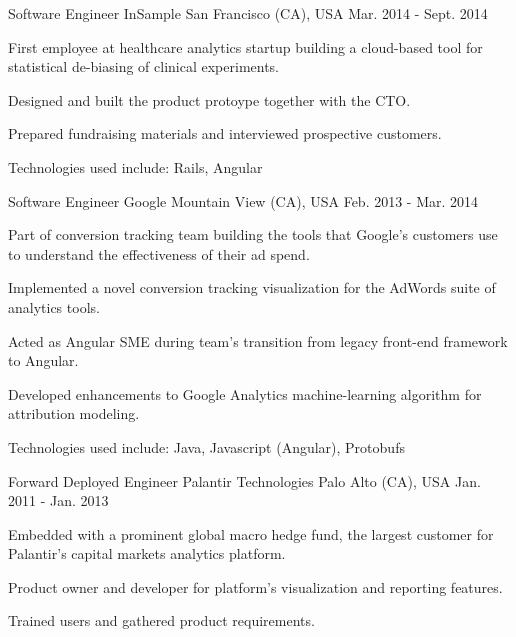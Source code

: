 \begin{cventries}
  \cventry
    {Software Engineer} %
    {InSample} %
    {San Francisco (CA), USA} %
    {Mar. 2014 - Sept. 2014} %
    {
      \begin{cvitems} %
        \item {First employee at healthcare analytics startup building a cloud-based tool for statistical de-biasing of clinical experiments.}
        \item {Designed and built the product protoype together with the CTO.}
        \item {Prepared fundraising materials and interviewed prospective customers.}
        \item {Technologies used include: Rails, Angular}
      \end{cvitems}
    }

  \cventry
    {Software Engineer} %
    {Google} %
    {Mountain View (CA), USA} %
    {Feb. 2013 - Mar. 2014} %
    {
      \begin{cvitems} %
        \item {Part of conversion tracking team building the tools that Google's customers use to understand the effectiveness of their ad spend.}
        \item {Implemented a novel conversion tracking visualization for the AdWords suite of analytics tools.}
        \item {Acted as Angular SME during team’s transition from legacy front-end framework to Angular.}
        \item {Developed enhancements to Google Analytics machine-learning algorithm for attribution modeling.}
        \item {Technologies used include: Java, Javascript (Angular), Protobufs}
      \end{cvitems}
    }

  \cventry
    {Forward Deployed Engineer} %
    {Palantir Technologies} %
    {Palo Alto (CA), USA} %
    {Jan. 2011 - Jan. 2013} %
    {
      \begin{cvitems} %
        \item {Embedded with a prominent global macro hedge fund, the largest customer for Palantir's capital markets analytics platform.}
        \item {Product owner and developer for platform's visualization and reporting features.}
        \item {Trained users and gathered product requirements.}
      \end{cvitems}
    }

\end{cventries}
